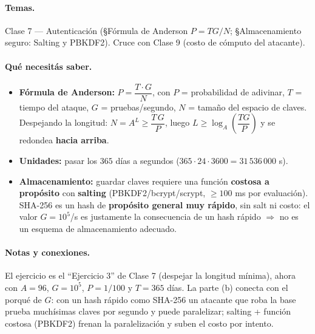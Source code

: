 \paragraph{Temas.}
Clase 7 — Autenticación (\S Fórmula de Anderson $P=TG/N$; \S Almacenamiento seguro: Salting y
PBKDF2). Cruce con Clase 9 (costo de cómputo del atacante).

\paragraph{Qué necesitás saber.}
\begin{itemize}
  \item \textbf{Fórmula de Anderson:} $P = \dfrac{T\cdot G}{N}$, con $P$ = probabilidad de
        adivinar, $T$ = tiempo del ataque, $G$ = pruebas/segundo, $N$ = tamaño del espacio de
        claves. Despejando la longitud: $N=A^{L}\ge \dfrac{T\,G}{P}$, luego
        $L \ge \log_A\!\left(\dfrac{TG}{P}\right)$ y se redondea \textbf{hacia arriba}.
  \item \textbf{Unidades:} pasar los $365$ días a segundos ($365\cdot 24\cdot 3600 =
        31\,536\,000$ s).
  \item \textbf{Almacenamiento:} guardar claves requiere una función \textbf{costosa a
        propósito} con \textbf{salting} (PBKDF2/bcrypt/scrypt, $\ge 100$ ms por evaluación).
        SHA-256 es un hash de \textbf{propósito general muy rápido}, sin salt ni costo: el
        valor $G=10^5$/s es justamente la consecuencia de un hash rápido $\Rightarrow$ no es
        un esquema de almacenamiento adecuado.
\end{itemize}

\paragraph{Notas y conexiones.}
El ejercicio es el ``Ejercicio 3'' de Clase 7 (despejar la longitud mínima),
ahora con $A=96$, $G=10^5$, $P=1/100$ y $T=365$ días. La parte (b) conecta con el porqué de
$G$: con un hash rápido como SHA-256 un atacante que roba la base prueba muchísimas claves por
segundo y puede paralelizar; salting + función costosa (PBKDF2) frenan la paralelización y
suben el costo por intento.

